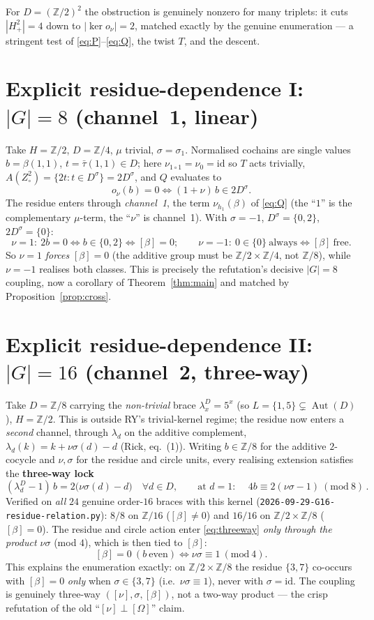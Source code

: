 \documentclass[11pt]{article}
\theoremstyle{definition}
\newcommand{\Z}{\mathbb{Z}}
\newcommand{\id}{\mathrm{id}}
\newcommand{\Aut}{\operatorname{Aut}}
\begin{document}
For $D=(\Z/2)^2$ the obstruction is genuinely nonzero for many triplets: it cuts
$|H^2_+|=4$ down to $|\ker o_\nu|=2$, matched exactly by the genuine enumeration --- a
stringent test of \eqref{eq:P}--\eqref{eq:Q}, the twist $T$, and the descent.

\section{Explicit residue-dependence I: $|G|=8$ (channel~1, linear)}\label{sec:g8}

Take $H=\Z/2$, $D=\Z/4$, $\mu$ trivial, $\sigma=\sigma_1$. Normalised cochains are single
values $b=\beta(1,1)$, $t=\bar\tau(1,1)\in D$; here $\nu_{1\circ1}=\nu_0=\id$ so $T$ acts
trivially, $A(Z^2_\circ)=\{2t: t\in D^{\sigma}\}=2D^\sigma$, and $Q$ evaluates to
\[
o_\nu(b)=0\iff (1+\nu)\,b\in 2D^{\sigma}.
\]
The residue enters through \emph{channel~1}, the term $\nu_{h_1}(\beta)$ of \eqref{eq:Q}
(the ``$1$'' is the complementary $\mu$-term, the ``$\nu$'' is channel~1). With $\sigma=-1$,
$D^\sigma=\{0,2\}$, $2D^\sigma=\{0\}$:
\[
\nu=1:\ 2b=0\iff b\in\{0,2\}\iff[\beta]=0;\qquad
\nu=-1:\ 0\in\{0\}\ \text{always}\iff[\beta]\ \text{free}.
\]
So $\nu=1$ \emph{forces} $[\beta]=0$ (the additive group must be $\Z/2\times\Z/4$, not
$\Z/8$), while $\nu=-1$ realises both classes. This is precisely the refutation's decisive
$|G|=8$ coupling, now a corollary of Theorem~\ref{thm:main} and matched by
Proposition~\ref{prop:cross}.

\section{Explicit residue-dependence II: $|G|=16$ (channel~2, three-way)}\label{sec:g16}

Take $D=\Z/8$ carrying the \emph{non-trivial} brace $\lambda^D_x=5^x$ (so $L=\{1,5\}
\subsetneq\Aut(D)$), $H=\Z/2$. This is outside RY's trivial-kernel regime; the residue now
enters a \emph{second} channel, through $\lambda_d$ on the additive complement,
$\lambda_d(k)=k+\nu\sigma(d)-d$ (Rick, eq.~(1)). Writing $b\in\Z/8$ for the additive
$2$-cocycle and $\nu,\sigma$ for the residue and circle units, every realising extension
satisfies the \textbf{three-way lock}
\begin{equation}\label{eq:threeway}
(\lambda^D_d-1)\,b=2\big(\nu\sigma(d)-d\big)\quad\forall d\in D,
\qquad\text{at }d=1:\quad \boxed{\,4b\equiv 2(\nu\sigma-1)\ (\mathrm{mod}\ 8)\,}.
\end{equation}
Verified on \emph{all} $24$ genuine order-$16$ braces with this kernel
(\texttt{2026-09-29-G16-residue-relation.py}): $8/8$ on $\Z/16$ ($[\beta]\neq0$) and
$16/16$ on $\Z/2\times\Z/8$ ($[\beta]=0$). The residue and circle action enter
\eqref{eq:threeway} \emph{only through the product $\nu\sigma$} (mod $4$), which is then
tied to $[\beta]$:
\[
[\beta]=0\ (b\ \text{even})\iff \nu\sigma\equiv1\ (\mathrm{mod}\ 4).
\]
This explains the enumeration exactly: on $\Z/2\times\Z/8$ the residue $\{3,7\}$
co-occurs with $[\beta]=0$ \emph{only} when $\sigma\in\{3,7\}$ (i.e.\ $\nu\sigma\equiv1$),
never with $\sigma=\id$. The coupling is genuinely three-way $([\nu],\sigma,[\beta])$, not a
two-way product --- the crisp refutation of the old ``$[\nu]\perp[\Omega]$'' claim.
\end{document}
